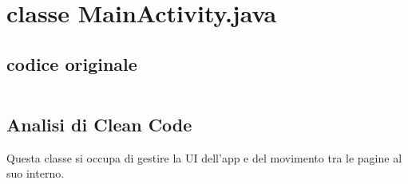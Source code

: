 \section{classe MainActivity.java}

\subsection{codice originale}
\begin{verbatim}

\end{verbatim}

\subsection{Analisi di Clean Code}

Questa classe si occupa di gestire la UI dell'app e del movimento tra le pagine al suo interno.

